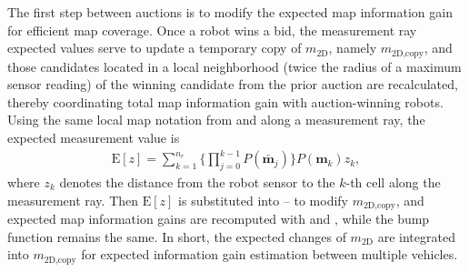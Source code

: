 The first step between auctions is to modify the expected map information gain for efficient map coverage.  Once a robot wins a bid, the measurement ray expected values serve to update a temporary copy of $ m_\text{2D}$, namely $ m_\text{2D,copy}$, and those candidates located in a local neighborhood (twice the radius of a maximum sensor reading) of the winning candidate from the prior auction are recalculated, thereby coordinating total map information gain with auction-winning robots. Using the same local map notation from  and  along a measurement ray, the expected measurement value is
\begin{align}
\label{eqn:ExpectedMeasRay}
\text{E}[z]=\sum_{k=1}^{n_{r}}\bigg\{\prod_{j=0}^{k-1}P(\bar{\mathbf{m}}_j)\bigg\}P(\mathbf{m}_k)z_k,
\end{align}
where $z_k$ denotes the distance from the robot sensor to the $k$-th cell along the measurement ray. Then $\text{E}[z]$ is substituted into -- to modify $ m_\text{2D,copy}$, and expected map information gains are recomputed with  and , while the bump function  remains the same. In short, the expected changes of $ m_\text{2D}$ are integrated into $ m_\text{2D,copy}$ for expected information gain estimation between multiple vehicles.


